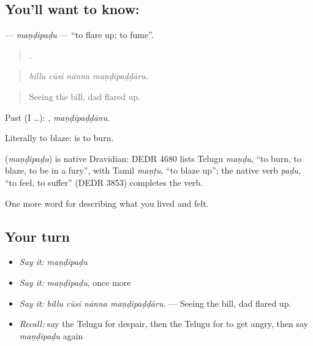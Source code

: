 \subsection*{You'll want to know: }
\textbf{} — \emph{maṇḍipaḍu} — \textquotedblleft{}to flare up; to fume\textquotedblright{}.

\begin{quote}
   .
\end{quote}

\begin{quote}
\emph{billu cūsi nānna maṇḍipaḍḍāru.}
\end{quote}

\begin{quote}
Seeing the bill, dad flared up.
\end{quote}

Past (I …): , \emph{maṇḍipaḍḍānu}.

Literally to blaze:  is to burn.

\begin{cousinweb}
\textbf{} (\emph{maṇḍipaḍu}) is native Dravidian: DEDR 4680 lists Telugu \emph{maṇḍu}, \textquotedblleft{}to burn, to blaze, to be in a fury\textquotedblright{}, with Tamil \emph{maṇṭu}, \textquotedblleft{}to blaze up\textquotedblright{}; the native verb \emph{paḍu}, \textquotedblleft{}to feel, to suffer\textquotedblright{} (DEDR 3853) completes the verb.
\end{cousinweb}

\begin{grammarlens}[title={What you've built}]
One more word for describing what you lived and felt.
\end{grammarlens}

\subsection*{Your turn}
\begin{itemize}
\raggedright
  \item \emph{Say it:} \emph{maṇḍipaḍu}
  \item \emph{Say it:} \emph{maṇḍipaḍu}, once more
  \item \emph{Say it:} \emph{billu cūsi nānna maṇḍipaḍḍāru.} — Seeing the bill, dad flared up.
  \item \emph{Recall:} say the Telugu for despair, then the Telugu for to get angry, then say \emph{maṇḍipaḍu} again
\end{itemize}

